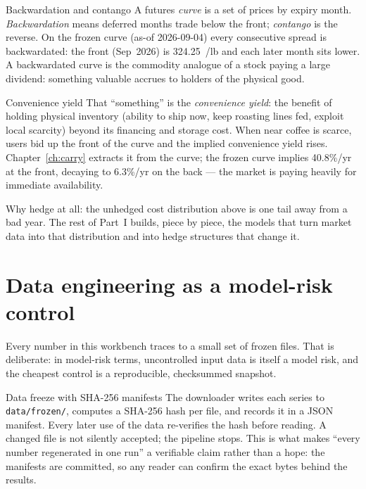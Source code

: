 \documentclass[11pt,a4paper]{article}
\begin{document}
\begin{concept}{Backwardation and contango}
A futures \emph{curve} is a set of prices by expiry month. \emph{Backwardation}
means deferred months trade below the front; \emph{contango} is the reverse.
On the frozen curve (as-of 2026-09-04) every consecutive spread is
backwardated: the front (Sep~2026) is 324.25~\textcent/lb and each later month
sits lower. A backwardated curve is the commodity analogue of a stock paying
a large dividend: something valuable accrues to holders of the physical
good.
\end{concept}

\begin{concept}{Convenience yield}
That ``something'' is the \emph{convenience yield}: the benefit of holding
physical inventory (ability to ship now, keep roasting lines fed, exploit
local scarcity) beyond its financing and storage cost. When near coffee is
scarce, users bid up the front of the curve and the implied convenience
yield rises. Chapter~\ref{ch:carry} extracts it from the curve; the frozen
curve implies 40.8\%/yr at the front, decaying to 6.3\%/yr on the back ---
the market is paying heavily for immediate availability.
\end{concept}

Why hedge at all: the unhedged cost distribution above is one tail away
from a bad year. The rest of Part~I builds, piece by piece, the models that
turn market data into that distribution and into hedge structures that
change it.

\section{Data engineering as a model-risk control}
\label{ch:data}

Every number in this workbench traces to a small set of frozen files. That
is deliberate: in model-risk terms, uncontrolled input data is itself a
model risk, and the cheapest control is a reproducible, checksummed
snapshot.

\begin{concept}{Data freeze with SHA-256 manifests}
The downloader writes each series to \texttt{data/frozen/}, computes a
SHA-256 hash per file, and records it in a JSON manifest. Every later use
of the data re-verifies the hash before reading. A changed file is not
silently accepted; the pipeline stops. This is what makes ``every number
regenerated in one run'' a verifiable claim rather than a hope: the
manifests are committed, so any reader can confirm the exact bytes behind
the results.
\end{concept}
\end{document}

